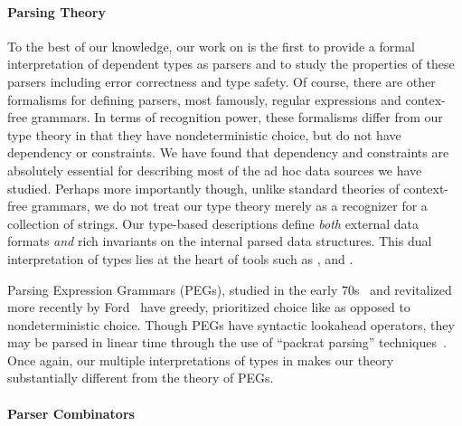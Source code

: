 \paragraph*{Parsing Theory}
To the best of our knowledge, our work on \ddc{} is the first to
provide a formal interpretation of dependent types as parsers and to
study the properties of these parsers including error correctness and
type safety. Of course, there are other formalisms for defining
parsers, most famously, regular expressions and contex-free grammars.
In terms of recognition power, these formalisms differ from our type
theory in that they have nondeterministic choice, but do not have
dependency or constraints.  We have found that dependency and
constraints are absolutely essential for describing most of the ad hoc
data sources we have studied.  Perhaps more importantly though, unlike
standard theories of context-free grammars, we do not treat our type
theory merely as a recognizer for a collection of strings.  Our
type-based descriptions define {\em both} external data formats {\em
  and} rich invariants on the internal parsed data structures.  This
dual interpretation of types lies at the heart of tools such as \pads,
\datascript{} and \packettypes{}.

Parsing Expression Grammars (PEGs), studied in the early
70s~\cite{birman+:parsing} and revitalized more recently by
Ford~\cite{ford:pegs} have greedy, prioritized choice like \ddc{} as opposed to
nondeterministic choice.  Though PEGs have syntactic lookahead
operators, they may be parsed in linear time through the use of
``packrat parsing'' techniques~\cite{ford:packrat,grimm:packrat}.
Once again, our multiple interpretations of types in \ddc{} makes our
theory substantially different from the theory of PEGs.


\paragraph*{Parser Combinators}

